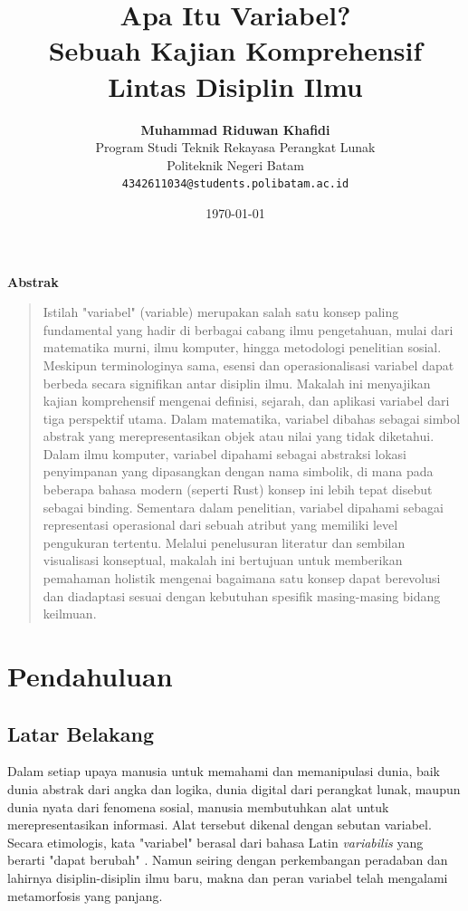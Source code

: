 \documentclass[11pt,a4paper]{article}
\title{\vspace{-1cm}\textbf{\sffamily\LARGE Apa Itu Variabel?\\ Sebuah Kajian Komprehensif Lintas Disiplin Ilmu}}
\author{
	\textbf{Muhammad Riduwan Khafidi} \\
	\small Program Studi Teknik Rekayasa Perangkat Lunak \\
	\small Politeknik Negeri Batam \\
	\small \texttt{4342611034@students.polibatam.ac.id}
}
\date{\small\today}
\renewenvironment{abstract}
{\small
	\begin{center}\textbf{\sffamily Abstrak}\end{center}
	\begin{quote}}
	{\end{quote}}
\begin{document}
\maketitle
\thispagestyle{empty}

\begin{abstract}
	Istilah "variabel" (variable) merupakan salah satu konsep paling fundamental yang hadir di berbagai cabang ilmu pengetahuan, mulai dari matematika murni, ilmu komputer, hingga metodologi penelitian sosial. Meskipun terminologinya sama, esensi dan operasionalisasi variabel dapat berbeda secara signifikan antar disiplin ilmu. Makalah ini menyajikan kajian komprehensif mengenai definisi, sejarah, dan aplikasi variabel dari tiga perspektif utama. Dalam matematika, variabel dibahas sebagai simbol abstrak yang merepresentasikan objek atau nilai yang tidak diketahui. Dalam ilmu komputer, variabel dipahami sebagai abstraksi lokasi penyimpanan yang dipasangkan dengan nama simbolik, di mana pada beberapa bahasa modern (seperti Rust) konsep ini lebih tepat disebut sebagai binding. Sementara dalam penelitian, variabel dipahami sebagai representasi operasional dari sebuah atribut yang memiliki level pengukuran tertentu. Melalui penelusuran literatur dan sembilan visualisasi konseptual, makalah ini bertujuan untuk memberikan pemahaman holistik mengenai bagaimana satu konsep dapat berevolusi dan diadaptasi sesuai dengan kebutuhan spesifik masing-masing bidang keilmuan.
\end{abstract}

\section{Pendahuluan}

\subsection{Latar Belakang}

Dalam setiap upaya manusia untuk memahami dan memanipulasi dunia, baik dunia abstrak dari angka dan logika, dunia digital dari perangkat lunak, maupun dunia nyata dari fenomena sosial, manusia membutuhkan alat untuk merepresentasikan informasi. Alat tersebut dikenal dengan sebutan variabel. Secara etimologis, kata "variabel" berasal dari bahasa Latin \textit{variabilis} yang berarti "dapat berubah" \cite{wikipedia_math}. Namun seiring dengan perkembangan peradaban dan lahirnya disiplin-disiplin ilmu baru, makna dan peran variabel telah mengalami metamorfosis yang panjang.
\end{document}
